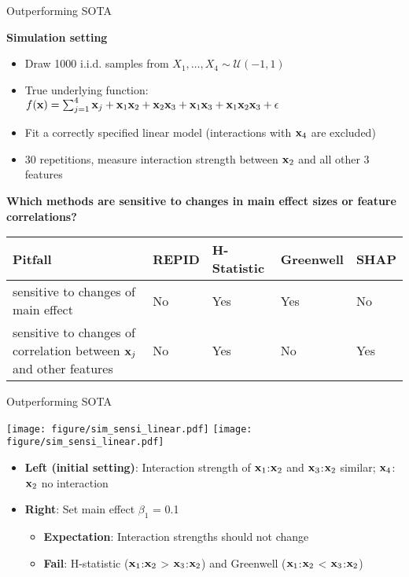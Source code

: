 \documentclass[11pt,compress,t,notes=noshow, aspectratio=169, xcolor=table,dvipsnames]{beamer}
\begin{document}
\begin{frame}{Outperforming SOTA}

\textbf{Simulation setting}
\begin{itemize}
    \item Draw 1000 i.i.d. samples from $X_1, \ldots , X_4 \sim \mathcal{U}(-1,1)$
    \item True underlying function: $f(\mathbf{x}) = \sum\nolimits_{j=1}^4 \mathbf{x}_j + \mathbf{x}_1 \mathbf{x}_2 + \mathbf{x}_2 \mathbf{x}_3 + \mathbf{x}_1 \mathbf{x}_3 + \mathbf{x}_1 \mathbf{x}_2 \mathbf{x}_3 + \epsilon$ %
    \item Fit a correctly specified linear model (interactions with $\mathbf{x}_4$ are excluded)
    \item 30 repetitions, measure interaction strength between $\mathbf{x}_2$ and all other 3 features
\end{itemize}

\textbf{Which methods are sensitive to changes in main effect sizes or feature correlations?}


    \begin{table}[thb]
\vspace{.1in}
    \label{tab:simSummary}
    \begin{center}
    \begin{tabular}{|p{5.4cm}|p{1.6cm}|p{1.8cm}|p{1.6cm}|p{1.6cm}|}
    \hline
       Pitfall & REPID & H-Statistic & Greenwell & SHAP  \\\hline
       sensitive to changes of main effect & No & Yes & Yes & No\\\hline
       sensitive to changes of correlation between $\mathbf{x}_j$ and other features & No & Yes & No & Yes\\
  \hline
    \end{tabular}
    \end{center}
\end{table}
\vspace*{0.2cm}




\end{frame}

\begin{frame}{Outperforming SOTA}
\centerline{
\texttt{[image: figure/sim\_sensi\_linear.pdf]}
\texttt{[image: figure/sim\_sensi\_linear.pdf]}
}

   \begin{itemize}
       \item \textbf{Left (initial setting)}: Interaction strength of $\mathbf{x}_1$:$\mathbf{x}_2$ and $\mathbf{x}_3$:$\mathbf{x}_2$ similar; $\mathbf{x}_4$:$\mathbf{x}_2$ no interaction
       \item \textbf{Right}: Set main effect $\beta_1$ = 0.1
       
   \begin{itemize}
       \item \textbf{Expectation}: Interaction strengths should not change
       \item \textbf{Fail}: H-statistic ($\mathbf{x}_1$:$\mathbf{x}_2$ > $\mathbf{x}_3$:$\mathbf{x}_2$) and Greenwell ($\mathbf{x}_1$:$\mathbf{x}_2$ < $\mathbf{x}_3$:$\mathbf{x}_2$) 
   \end{itemize}
   \end{itemize}
\end{frame}
\end{document}
